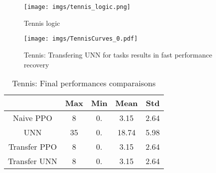 \documentclass[letterpaper, 10 pt, conference]{ieeeconf}  %
\begin{document}


\begin{figure}
\centering
\texttt{[image: imgs/tennis\_logic.png]}
\caption{Tennis logic}
\label{tennis_logic}
\end{figure}



\begin{figure}
\centering
\texttt{[image: imgs/TennisCurves\_0.pdf]}
\caption{Tennis: Transfering UNN for tasks results in fast performance recovery}
\label{transfer0}
\end{figure}


\begin{table}[]
\centering
\caption{Tennis: Final performances comparaisons}
\label{tennis_final}
\begin{tabular}{ccccc}
                     & Max                  & Min                  & Mean                 & Std                  \\
                     \hline
Naive PPO            & 8                    & 0.                    & 3.15                    & 2.64                    \\
UNN                  & 35                   & 0.                    & 18.74                    & 5.98                   \\ 
Transfer PPO            & 8                    & 0.                    & 3.15                    & 2.64                    \\
Transfer UNN           & 8                    & 0.                    & 3.15                    & 2.64                    
\end{tabular}
\end{table}
\end{document}
